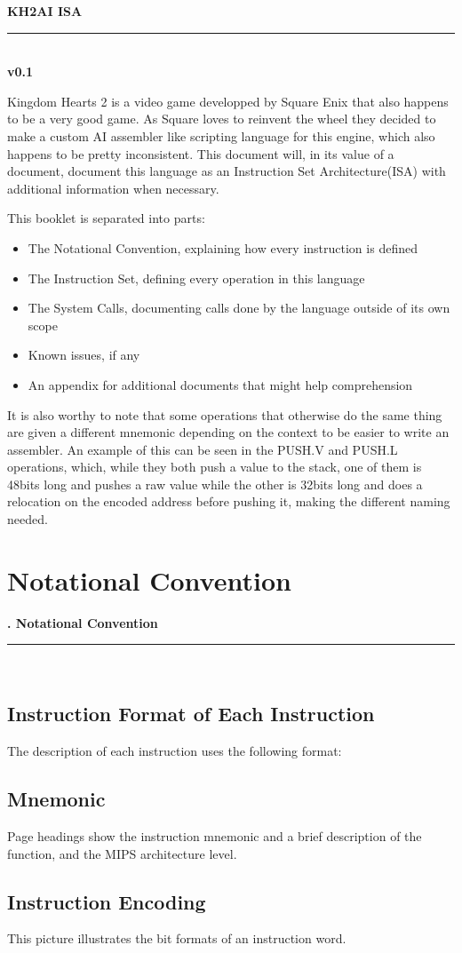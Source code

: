 \documentclass[openany,oneside]{memoir}
\newcommand\version{v0.1}
\newcommand{\Line}{\rule{\linewidth}{1.0mm}}
\newcommand{\Chapter}[1]{
\pagestyle{fancy}
\chapter{#1}
\begin{vplace}[0.7]
{\Huge   \null\hfill{\textbf{\thechapter.  #1}}} \\
\Line \\
\end{vplace} 
\newpage
}
\newcommand{\Main}[2]{
\begin{vplace}[0.7]
{\Huge   \null\hfill{\textbf{#1}}} \\
\Line \\
\huge \null\hfill \textbf{#2}
\end{vplace}
\newpage
}
\begin{document}
\Main{KH2AI ISA}{\version}

Kingdom Hearts 2 is a video game developped by Square Enix that also happens to
be a very good game. As Square loves to reinvent the wheel they decided to make
a custom AI assembler like scripting language for this engine, which also
happens to be pretty inconsistent. 
This document will, in its value of a document, document this language as an
Instruction Set Architecture(ISA) with additional information when necessary.

This booklet is separated into parts:
\begin{itemize}
\item The Notational Convention, explaining how every instruction is defined
\item The Instruction Set, defining every operation in this language
\item The System Calls, documenting calls done by the language outside of its own scope
\item Known issues, if any
\item An appendix for additional documents that might help comprehension
\end{itemize}
It is also worthy to note that some operations that otherwise do the same thing
are given a different mnemonic depending on the context to be easier to write an
assembler. An example of this can be seen in the PUSH.V and PUSH.L operations,
which, while they both push a value to the stack, one of them is 48bits long and
pushes a raw value while the other is 32bits long and does a relocation on the
encoded address before pushing it, making the different naming needed.

\Chapter{Notational Convention}

\section{Instruction Format of Each Instruction} 
The description of each instruction uses the following format:

\section{Mnemonic}
Page headings show the instruction mnemonic and a brief description of the function, and the MIPS architecture level.
\section{Instruction Encoding} 
This picture illustrates the bit formats of an instruction word. 
\end{document}
